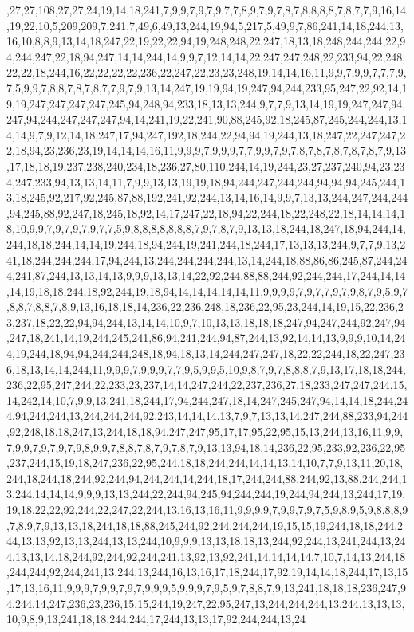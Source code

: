 ,27,27,108,27,27,24,19,14,18,241,7,9,9,7,9,7,9,7,7,8,9,7,9,7,8,7,8,8,8,8,7,8,7,7,9,16,14,19,22,10,5,209,209,7,241,7,49,6,49,13,244,19,94,5,217,5,49,9,7,86,241,14,18,244,13,16,10,8,8,9,13,14,18,247,22,19,22,22,94,19,248,248,22,247,18,13,18,248,244,244,22,94,244,247,22,18,94,247,14,14,244,14,9,9,7,12,14,14,22,247,247,248,22,233,94,22,248,22,22,18,244,16,22,22,22,22,236,22,247,22,23,23,248,19,14,14,16,11,9,9,7,9,9,7,7,7,9,7,5,9,9,7,8,8,7,8,7,8,7,7,9,7,9,13,14,247,19,19,94,19,247,94,244,233,95,247,22,92,14,19,19,247,247,247,247,245,94,248,94,233,18,13,13,244,9,7,7,9,13,14,19,19,247,247,94,247,94,244,247,247,247,94,14,241,19,22,241,90,88,245,92,18,245,87,245,244,244,13,14,14,9,7,9,12,14,18,247,17,94,247,192,18,244,22,94,94,19,244,13,18,247,22,247,247,22,18,94,23,236,23,19,14,14,14,16,11,9,9,9,7,9,9,9,7,7,9,9,7,9,7,8,7,8,7,8,7,8,7,8,7,9,13,17,18,18,19,237,238,240,234,18,236,27,80,110,244,14,19,244,23,27,237,240,94,23,234,247,233,94,13,13,14,11,7,9,9,13,13,19,19,18,94,244,247,244,244,94,94,94,245,244,13,18,245,92,217,92,245,87,88,192,241,92,244,13,14,16,14,9,9,7,13,13,244,247,244,244,94,245,88,92,247,18,245,18,92,14,17,247,22,18,94,22,244,18,22,248,22,18,14,14,14,18,10,9,9,7,9,7,9,7,9,7,7,5,9,8,8,8,8,8,8,8,7,9,7,8,7,9,13,13,18,244,18,247,18,94,244,14,244,18,18,244,14,14,19,244,18,94,244,19,241,244,18,244,17,13,13,13,244,9,7,7,9,13,241,18,244,244,244,17,94,244,13,244,244,244,244,13,14,244,18,88,86,86,245,87,244,244,241,87,244,13,13,14,13,9,9,9,13,13,14,22,92,244,88,88,244,92,244,244,17,244,14,14,14,19,18,18,244,18,92,244,19,18,94,14,14,14,14,14,11,9,9,9,9,7,9,7,7,9,7,9,8,7,9,5,9,7,8,8,7,8,8,7,8,9,13,16,18,18,14,236,22,236,248,18,236,22,95,23,244,14,19,15,22,236,23,237,18,22,22,94,94,244,13,14,14,10,9,7,10,13,13,18,18,18,247,94,247,244,92,247,94,247,18,241,14,19,244,245,241,86,94,241,244,94,87,244,13,92,14,14,13,9,9,9,10,14,244,19,244,18,94,94,244,244,248,18,94,18,13,14,244,247,247,18,22,22,244,18,22,247,236,18,13,14,14,244,11,9,9,9,7,9,9,9,7,7,9,5,9,9,5,10,9,8,7,9,7,8,8,8,7,9,13,17,18,18,244,236,22,95,247,244,22,233,23,237,14,14,247,244,22,237,236,27,18,233,247,247,244,15,14,242,14,10,7,9,9,13,241,18,244,17,94,244,247,18,14,247,245,247,94,14,14,18,244,244,94,244,244,13,244,244,244,92,243,14,14,14,13,7,9,7,13,13,14,247,244,88,233,94,244,92,248,18,18,247,13,244,18,18,94,247,247,95,17,17,95,22,95,15,13,244,13,16,11,9,9,7,9,9,7,9,7,9,7,9,8,9,9,7,8,8,7,8,7,9,7,8,7,9,13,13,94,18,14,236,22,95,233,92,236,22,95,237,244,15,19,18,247,236,22,95,244,18,18,244,244,14,14,13,14,10,7,7,9,13,11,20,18,244,18,244,18,244,92,244,94,244,244,14,244,18,17,244,244,88,244,92,13,88,244,244,13,244,14,14,14,9,9,9,13,13,244,22,244,94,245,94,244,244,19,244,94,244,13,244,17,19,19,18,22,22,92,244,22,247,22,244,13,16,13,16,11,9,9,9,9,7,9,9,7,9,7,5,9,8,9,5,9,8,8,8,9,7,8,9,7,9,13,13,18,244,18,18,88,245,244,92,244,244,244,19,15,15,19,244,18,18,244,244,13,13,92,13,13,244,13,13,244,10,9,9,9,13,13,18,18,13,244,92,244,13,241,244,13,244,13,13,14,18,244,92,244,92,244,241,13,92,13,92,241,14,14,14,14,7,10,7,14,13,244,18,244,244,92,244,241,13,244,13,244,16,13,16,17,18,244,17,92,19,14,14,18,244,17,13,15,17,13,16,11,9,9,9,7,9,9,7,9,7,9,9,9,5,9,9,9,7,9,5,9,7,8,8,7,9,13,241,18,18,18,236,247,94,244,14,247,236,23,236,15,15,244,19,247,22,95,247,13,244,244,244,13,244,13,13,13,10,9,8,9,13,241,18,18,244,244,17,244,13,13,17,92,244,244,13,24